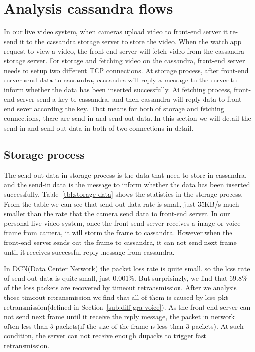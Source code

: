 
\section{Analysis cassandra flows}
\label{sec:cassandra-flows}

In our live video system, when cameras upload video to front-end server it re-send it to the cassandra storage server to store the video. When the watch app request to view a video, the front-end server will fetch video from the cassandra storage server. For storage and fetching video on the cassandra, front-end server needs to setup two different TCP connections. At storage process, after front-end server send data to cassandra, cassandra will reply a message to the server to inform whether the data has been inserted successfully. At fetching process, front-end server send a key to cassandra, and then cassandra will reply data to front-end sever according the key. That means for both of storage and fetching connections, there are send-in and send-out data. In this section we will detail the  send-in and send-out data in both of two connections in detail. 

\subsection{Storage process}
\label{sub:storm}
The send-out data in storage process is the data that need to store in cassandra, and the send-in data is the message to inform whether the data has been inserted successfully. Table~\ref{tbl:storage-data} shows the statistics in the storage process. From the table we can see that send-out data rate is small, just 35KB/s much smaller than the rate that the camera send data to front-end server. In our personal live video system, once the front-send server receives a image or voice frame from camera, it will storm the frame to cassandra. However when the front-end server sends out the frame to cassandra, it can not send next frame until it receives successful reply message from cassandra. 

In DCN(Data Center Network) the packet loss rate is quite small, so the loss rate of send-out data is quite small, just 0.001\%. But surprisingly, we find that 69.8\% of the loss packets are recovered by timeout retransmission. After we analysis those timeout retransmission we find that all of them is caused by less pkt retransmission(defined in Section~\ref{sub:diff-gra-voice}). As the front-end server can not send next frame until it receive the reply message, the packet in network often less than 3 packets(if the size of the frame is less than 3 packets). At such condition, the server can not receive enough dupacks to trigger fast retransmission.  

